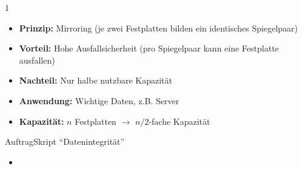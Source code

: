 \begin{frame}{ 1}
    \begin{center}
        
    \end{center}
    \begin{itemize}
        \item \textbf{Prinzip:} Mirroring (je zwei Festplatten bilden ein identisches Spiegelpaar)
        \item \textbf{Vorteil:} Hohe Ausfallsicherheit (pro Spiegelpaar kann eine Festplatte ausfallen)
        \item \textbf{Nachteil:} Nur halbe nutzbare Kapazität
        \item \textbf{Anwendung:} Wichtige Daten, z.B. Server
        \item \textbf{Kapazität:} $n$ Festplatten $\rightarrow$ $n/2$-fache Kapazität
    \end{itemize}
\end{frame}

\begin{frame}{Auftrag}{Skript \enquote{Datenintegrität}}
    \begin{itemize}
        \item {}
    \end{itemize}
\end{frame}


